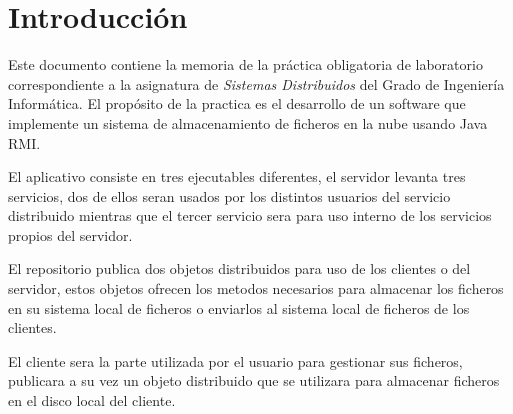 
\chapter{Introducción}

Este documento contiene la memoria de la práctica obligatoria de laboratorio correspondiente a la asignatura de \emph{Sistemas Distribuidos} del Grado de Ingeniería Informática. El propósito de la practica es el desarrollo de un software que implemente un sistema de almacenamiento de ficheros en la nube usando Java RMI.

El aplicativo consiste en tres ejecutables diferentes, el servidor levanta tres servicios, dos de ellos seran usados por los distintos usuarios del servicio distribuido mientras que el tercer servicio sera para uso interno de los servicios propios del servidor.

El repositorio publica dos objetos distribuidos para uso de los clientes o del servidor, estos objetos ofrecen los metodos necesarios para almacenar los ficheros en su sistema local de ficheros o enviarlos al sistema local de ficheros de los clientes.

El cliente sera la parte utilizada por el usuario para gestionar sus ficheros, publicara a su vez un objeto distribuido que se utilizara para almacenar ficheros en el disco local del cliente.
